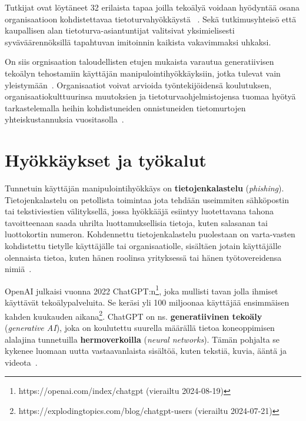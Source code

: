 \begin{otherlanguage}{finnish}
Tutkijat ovat löytäneet 32 erilaista tapaa joilla tekoälyä voidaan hyödyntää osana organisaatioon kohdistettavaa tietoturvahyökkäystä ~\citep{mirsky_Threat_Offensive_AI_Organizations_2023}. Sekä tutkimusyhteisö että kaupallisen alan tietoturva-asiantuntijat valitsivat yksimielisesti syväväärennöksillä tapahtuvan imitoinnin kaikista vakavimmaksi uhkaksi. 

On siis orgnisaation taloudellisten etujen mukaista varautua generatiivisen tekoälyn tehostamiin käyttäjän manipulointihyökkäyksiin, jotka tulevat vain yleistymään~\citep{blauth_AI_Crime_Overview_Malicious_Use_Abuse_2022}. Organisaatiot voivat arvioida työntekijöidensä koulutuksen, organisaatiokulttuurinsa muutoksien ja tietoturvaohjelmistojensa tuomaa hyötyä tarkastelemalla heihin kohdistuneiden onnistuneiden tietomurtojen yhteiskustannuksia vuositasolla~\citep{ibm_Cost_Data_Breach_Report_2024}.







\section*{Hyökkäykset ja työkalut}

Tunnetuin käyttäjän manipulointihyökkäys on \textbf{tietojenkalastelu} (\textit{phishing}). Tietojenkalastelu on petollista toimintaa jota tehdään useimmiten sähköpostin tai tekstiviestien välityksellä, jossa hyökkääjä esiintyy luotettavana tahona tavoitteenaan saada uhrilta luottamuksellisia tietoja, kuten salasanan tai luottokortin numeron. Kohdennettu tietojenkalastelu puolestaan on varta-vasten kohdistettu tietylle käyttäjälle tai organisaatiolle, sisältäen jotain käyttäjälle olennaista tietoa, kuten hänen roolinsa yrityksessä tai hänen työtovereidensa nimiä~\citep{wang_Defining_Social_Engineering_2020}.

OpenAI julkaisi vuonna 2022 ChatGPT:n\footnote{https://openai.com/index/chatgpt (vierailtu 2024-08-19)}, joka mullisti tavan jolla ihmiset käyttävät tekoälypalveluita. Se keräsi yli 100 miljoonaa käyttäjää ensimmäisen kahden kuukauden aikana\footnote{https://explodingtopics.com/blog/chatgpt-users (vierailtu 2024-07-21)}. ChatGPT on ns. \textbf{generatiivinen tekoäly} (\textit{generative AI}), joka on koulutettu suurella määrällä tietoa koneoppimisen alalajina tunnetuilla \textbf{hermoverkoilla} (\textit{neural networks}). Tämän pohjalta se kykenee luomaan uutta vastaavanlaista sisältöä, kuten tekstiä, kuvia, ääntä ja videota~\citep{fakhouri_AI_Driven_Solutions_SE_Attacks_2024}.


\end{otherlanguage}
